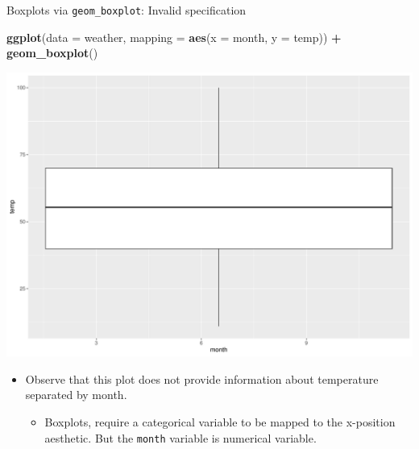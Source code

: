 \documentclass[
  ignorenonframetext,
]{beamer}
\newenvironment{Shaded}{\begin{snugshade}}{\end{snugshade}}
\newcommand{\AttributeTok}[1]{\textcolor[rgb]{0.13,0.29,0.53}{#1}}
\newcommand{\FunctionTok}[1]{\textcolor[rgb]{0.13,0.29,0.53}{\textbf{#1}}}
\newcommand{\NormalTok}[1]{#1}
\newcommand{\SpecialCharTok}[1]{\textcolor[rgb]{0.81,0.36,0.00}{\textbf{#1}}}
\providecommand{\tightlist}{%
  \setlength{\itemsep}{0pt}\setlength{\parskip}{0pt}}
\begin{document}
\begin{frame}[fragile]{Boxplots via \texttt{geom\_boxplot}: Invalid
specification}
\protect\hypertarget{boxplots-via-geom_boxplot-invalid-specification}{}
\tiny

\begin{Shaded}
\begin{Highlighting}[]
\FunctionTok{ggplot}\NormalTok{(}\AttributeTok{data =}\NormalTok{ weather, }\AttributeTok{mapping =} \FunctionTok{aes}\NormalTok{(}\AttributeTok{x =}\NormalTok{ month, }\AttributeTok{y =}\NormalTok{ temp)) }\SpecialCharTok{+}
  \FunctionTok{geom\_boxplot}\NormalTok{()}
\end{Highlighting}
\end{Shaded}

\begin{center}\includegraphics[width=0.4\linewidth,height=0.5\textheight]{Week2_Lect_files/figure-beamer/unnamed-chunk-34-1} \end{center}
\normalsize

\begin{itemize}
\item
  Observe that this plot does not provide information about temperature
  separated by month.

  \begin{itemize}
  \tightlist
  \item
    Boxplots, require a categorical variable to be mapped to the
    x-position aesthetic. But the \texttt{month} variable is numerical
    variable.
  \end{itemize}
\end{itemize}
\end{frame}
\end{document}
